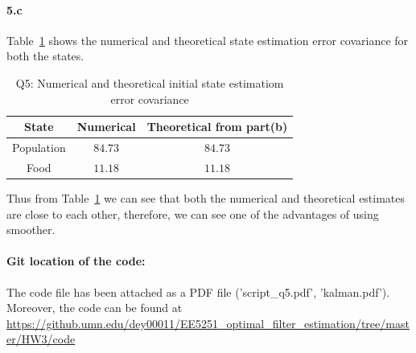 \paragraph{5.c}Table~\ref{tbl:q5_init_cov} shows the numerical and theoretical state estimation error covariance for both the states.
\begin{table}[ht]
	\centering
	\caption{Q5: Numerical and theoretical initial state estimatiom error covariance}
	\begin{tabular}[t]{ccc} 
		\hline
		State 			& Numerical & Theoretical from part(b)\\ [0.5ex] 
		\hline
		Population 	& $84.73$ 	& $84.73$\\
		Food 	& $11.18$ 	& $11.18$\\[1ex]
		\hline
	\end{tabular}
	\label{tbl:q5_init_cov}
\end{table}
Thus from Table~\ref{tbl:q5_init_cov} we can see that both the numerical and theoretical estimates are close to each other, therefore, we can see one of the advantages of using smoother.
 \paragraph{Git location of the code:} The code file has been attached as a PDF file ('script\_q5.pdf', 'kalman.pdf'). Moreover, the code can be found at\\
 \url{https://github.umn.edu/dey00011/EE5251\_optimal\_filter\_estimation/tree/master/HW3/code}